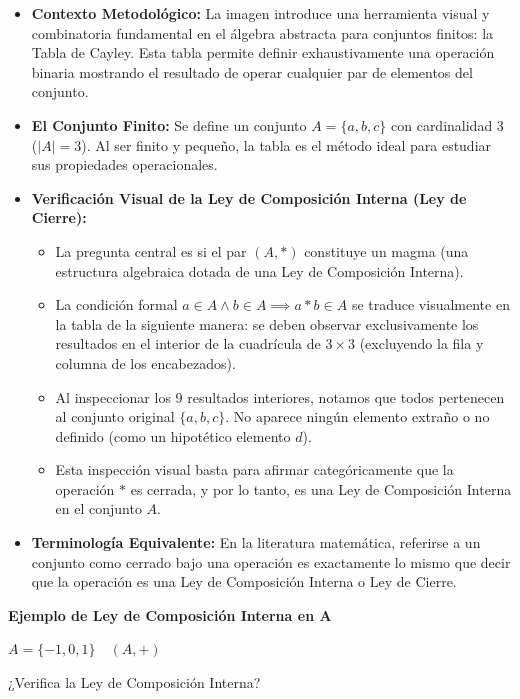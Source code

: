 \documentclass{article}
\begin{document}
\begin{itemize}    
\item \textbf{Contexto Metodológico:} La imagen introduce una herramienta visual y combinatoria fundamental en el álgebra abstracta para conjuntos finitos: la Tabla de Cayley. Esta tabla permite definir exhaustivamente una operación binaria mostrando el resultado de operar cualquier par de elementos del conjunto.
\item \textbf{El Conjunto Finito:} Se define un conjunto $A = \{a, b, c\}$ con cardinalidad 3 ($|A| = 3$). Al ser finito y pequeño, la tabla es el método ideal para estudiar sus propiedades operacionales.
\item \textbf{Verificación Visual de la Ley de Composición Interna (Ley de Cierre):}
\begin{itemize} 
\item La pregunta central es si el par $(A, *)$ constituye un magma (una estructura algebraica dotada de una Ley de Composición Interna).
\item La condición formal $a \in A \land b \in A \implies a * b \in A$ se traduce visualmente en la tabla de la siguiente manera: se deben observar exclusivamente los resultados en el interior de la cuadrícula de $3 \times 3$ (excluyendo la fila y columna de los encabezados).
\item Al inspeccionar los 9 resultados interiores, notamos que todos pertenecen al conjunto original $\{a, b, c\}$. No aparece ningún elemento extraño o no definido (como un hipotético elemento $d$).
\item Esta inspección visual basta para afirmar categóricamente que la operación $*$ es cerrada, y por lo tanto, es una Ley de Composición Interna en el conjunto $A$.
\end{itemize}

\item \textbf{Terminología Equivalente:} En la literatura matemática, referirse a un conjunto como cerrado bajo una operación es exactamente lo mismo que decir que la operación es una Ley de Composición Interna o Ley de Cierre.
\end{itemize}
\bigskip

\noindent \textbf{Ejemplo de Ley de Composición Interna en A} 
\bigskip


\noindent $A = \{-1, 0, 1\} \quad (A, +)$
\bigskip

\noindent ¿Verifica la Ley de Composición Interna?
\end{document}
